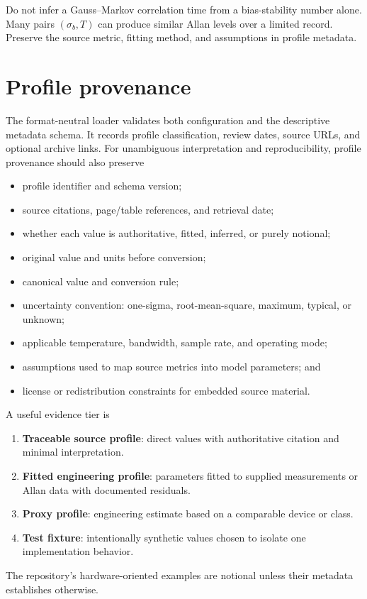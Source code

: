 \documentclass[11pt,oneside,headings=big]{scrreprt}
\begin{document}
    \begin{warningbox}
        Do not infer a Gauss--Markov correlation time from a bias-stability number alone.
        Many pairs \((\sigma_b,T)\) can produce similar Allan levels over a limited
        record. Preserve the source metric, fitting method, and assumptions in profile
        metadata.
    \end{warningbox}


    \section{Profile provenance}
    The format-neutral  loader validates both
    configuration and the descriptive metadata schema. It records profile
    classification, review dates, source URLs, and optional archive links. For
    unambiguous interpretation and reproducibility, profile provenance should also
    preserve
    \begin{itemize}
        \item profile identifier and schema version;
        \item source citations, page/table references, and retrieval date;
        \item whether each value is authoritative, fitted, inferred, or purely
        notional;
        \item original value and units before conversion;
        \item canonical value and conversion rule;
        \item uncertainty convention: one-sigma, root-mean-square, maximum, typical,
        or unknown;
        \item applicable temperature, bandwidth, sample rate, and operating mode;
        \item assumptions used to map source metrics into model parameters; and
        \item license or redistribution constraints for embedded source material.
    \end{itemize}

    A useful evidence tier is
    \begin{enumerate}
        \item \textbf{Traceable source profile}: direct values with authoritative
        citation and minimal interpretation.
        \item \textbf{Fitted engineering profile}: parameters fitted to supplied
        measurements or Allan data with documented residuals.
        \item \textbf{Proxy profile}: engineering estimate based on a comparable
        device or class.
        \item \textbf{Test fixture}: intentionally synthetic values chosen to isolate
        one implementation behavior.
    \end{enumerate}
    The repository's hardware-oriented examples are notional unless their metadata
    establishes otherwise.
\end{document}
